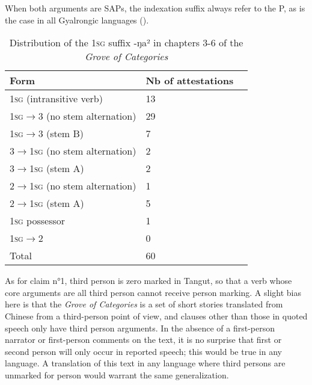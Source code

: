 \documentclass[oldfontcommands,oneside,a4paper,11pt]{article}
\newcommand{\ipa}[1]{{\phon \mbox{#1}}} %
\newcommand{\grise}[1]{\cellcolor{lightgray}\textbf{#1}}
\begin{document}
When both arguments are SAPs, the indexation suffix always refer to the P, as is the case in all Gyalrongic languages (\citealt{jackson03caodeng, jacques10inverse, gongxun14agreement, lai15person}). 

\begin{table}[H]
\caption{Distribution of the \textsc{1sg} suffix \ipa{-ŋa²} in chapters 3-6 of the \textit{Grove of Categories}} \label{tab:1sg} \centering
\begin{tabular}{lll}
\toprule
Form& Nb of attestations \\
\midrule
\textsc{1sg} (intransitive verb) & 	13 \\ 
\textsc{1sg}$\rightarrow$3  (no stem alternation) & 	29 \\ 
\textsc{1sg}$\rightarrow$3 (stem B)& 	7 \\ 
3$\rightarrow$\textsc{1sg} (no stem alternation) & 	2 \\ 
3$\rightarrow$\textsc{1sg} (stem A)& 	2 \\ 
2$\rightarrow$\textsc{1sg} (no stem alternation)& 	1 \\ 
2$\rightarrow$\textsc{1sg}  (stem A)& 	5 \\ 
\textsc{1sg} possessor & 	1 \\ 
\grise{}\textsc{1sg}$\rightarrow$2& \grise{}0 \\ 
\midrule
Total & 	60 \\ 
\bottomrule
\end{tabular}
\end{table}


As for claim n°1, third person is zero marked in Tangut, so that a verb whose core arguments are all third person cannot receive person marking. A slight bias here is that the \textit{Grove of Categories} is a set of short stories translated from Chinese from a third-person point of view, and clauses other than those in quoted speech only have third person arguments. In the absence of a first-person narrator or first-person comments on the text, it is no surprise that first or second person will only occur in reported speech; this would be true in any language. A translation of this text in any language where third persons are unmarked for person would warrant the same generalization.
\end{document}
